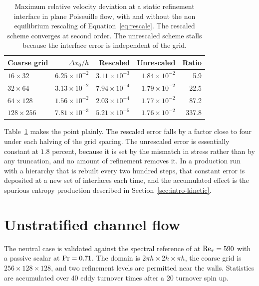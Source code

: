 \begin{table}[t]
\centering
\caption[Interface error with and without stress rescaling]{Maximum relative
velocity deviation at a static refinement interface in plane Poiseuille flow,
with and without the non equilibrium rescaling of Equation~\eqref{eq:rescale}.
The rescaled scheme converges at second order. The unrescaled scheme stalls
because the interface error is independent of the grid.}
\label{tab:interface-error}
\begin{tabular}{lrrrr}
\toprule
Coarse grid & $\Delta x_0 / h$ & Rescaled & Unrescaled & Ratio \\
\midrule
$16 \times 32$  & $6.25 \times 10^{-2}$ & $3.11 \times 10^{-3}$ & $1.84 \times 10^{-2}$ & 5.9 \\
$32 \times 64$  & $3.13 \times 10^{-2}$ & $7.94 \times 10^{-4}$ & $1.79 \times 10^{-2}$ & 22.5 \\
$64 \times 128$ & $1.56 \times 10^{-2}$ & $2.03 \times 10^{-4}$ & $1.77 \times 10^{-2}$ & 87.2 \\
$128 \times 256$& $7.81 \times 10^{-3}$ & $5.21 \times 10^{-5}$ & $1.76 \times 10^{-2}$ & 337.8 \\
\bottomrule
\end{tabular}
\end{table}

Table~\ref{tab:interface-error} makes the point plainly. The rescaled error
falls by a factor close to four under each halving of the grid spacing. The
unrescaled error is essentially constant at $1.8$ percent, because it is set by
the mismatch in stress rather than by any truncation, and no amount of
refinement removes it. In a production run with a hierarchy that is rebuilt
every two hundred steps, that constant error is deposited at a new set of
interfaces each time, and the accumulated effect is the spurious entropy
production described in Section~\ref{sec:intro-kinetic}.

\section{Unstratified channel flow}
\label{sec:val-channel}

The neutral case is validated against the spectral reference of
\citet{osei2016channel} at $\mathrm{Re}_\tau = 590$ with a passive scalar at
$\mathrm{Pr} = 0.71$. The domain is $2\pi h \times 2h \times \pi h$, the coarse grid
is $256 \times 128 \times 128$, and two refinement levels are permitted near the
walls. Statistics are accumulated over 40 eddy turnover times after a 20 turnover
spin up.

